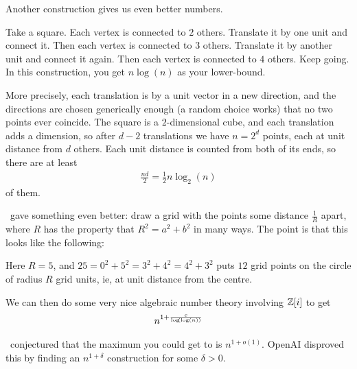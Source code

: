 Another construction gives us even better numbers.

Take a square. Each vertex is connected to $2$ others. Translate it by one unit and connect it. Then each vertex is connected to $3$ others. Translate it by another unit and connect it again. Then each vertex is connected to $4$ others. Keep going. In this construction, you get $n \log(n)$ as your lower-bound.

More precisely, each translation is by a unit vector in a new direction, and the directions are chosen generically enough (a random choice works) that no two points ever coincide. The square is a $2$-dimensional cube, and each translation adds a dimension, so after $d - 2$ translations we have $n = 2^d$ points, each at unit distance from $d$ others. Each unit distance is counted from both of its ends, so there are at least
\begin{align*}
    \frac{nd}{2} = \frac{1}{2} n \log_2(n)
\end{align*}
of them.

\Erdos\ gave something even better: draw a grid with the points some distance $\frac{1}{R}$ apart, where $R$ has the property that $R^2 = a^2 + b^2$ in many ways. The point is that this looks like the following:
\begin{figure}[H]
    \centering
\end{figure}
Here $R = 5$, and $25 = 0^2 + 5^2 = 3^2 + 4^2 = 4^2 + 3^2$ puts $12$ grid points on the circle of radius $R$ grid units, ie, at unit distance from the centre.

We can then do some very nice algebraic number theory involving $\mathbb{Z}[i]$ to get
\begin{align*}
    n^{1 + \frac{c}{\log\!\left( \log(n) \right)}}
\end{align*}

\Erdos\ conjectured that the maximum you could get to is $n^{1 + o(1)}$. OpenAI disproved this by finding an $n^{1 + \delta}$ construction for some $\delta > 0$.

